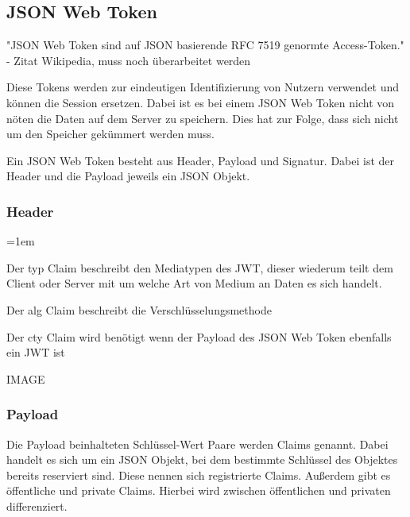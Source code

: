 \documentclass[11pt]{article}
\begin{document}
		\subsection{JSON Web Token}
		\label{sec: jwt}
		\begin{flushleft}
			"JSON Web Token sind auf JSON basierende RFC 7519 genormte Access-Token." - Zitat Wikipedia, muss noch überarbeitet werden\par\bigskip
			
			 Diese Tokens werden zur eindeutigen Identifizierung von Nutzern verwendet und können die Session ersetzen. Dabei ist es bei einem JSON Web Token nicht von nöten die Daten auf dem Server zu speichern. Dies hat zur Folge, dass sich nicht um den Speicher gekümmert werden muss. \par\bigskip
			
			Ein JSON Web Token besteht aus Header, Payload und Signatur. Dabei ist der Header und die Payload jeweils ein JSON Objekt.
			
			\subsubsection{Header}
			\label{sec: jwt_header}
			
			\begin{description}
				\leftskip=1em
				\item[typ] Der typ Claim beschreibt den Mediatypen des JWT, dieser wiederum teilt dem Client oder Server mit um welche Art von Medium an Daten es sich handelt.
				\item[alg] Der alg Claim beschreibt die Verschlüsselungsmethode
				\item[cty] Der cty Claim wird benötigt wenn der Payload des JSON Web Token ebenfalls ein JWT ist
			\end{description}
		
			IMAGE
			
			\subsubsection{Payload}
			\label{sec: jwt_payload}
			
			Die Payload beinhalteten Schlüssel-Wert Paare werden Claims genannt. Dabei handelt es sich um ein JSON Objekt, bei dem bestimmte Schlüssel des Objektes bereits reserviert sind. Diese nennen sich registrierte Claims. Außerdem gibt es öffentliche und private Claims. Hierbei wird zwischen öffentlichen und privaten differenziert.\par\bigskip
			

\end{flushleft}
\end{document}

